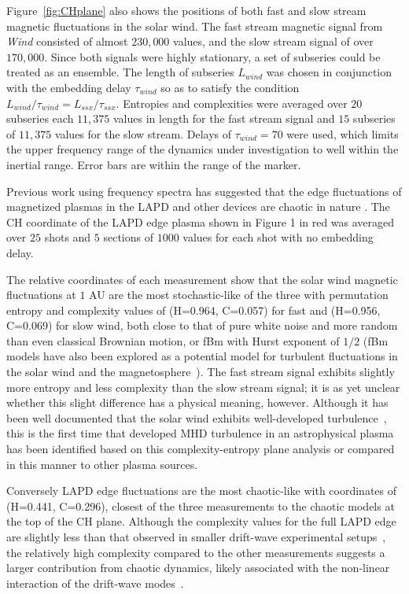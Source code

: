 \documentclass[aps,prx,twocolumn,secnumarabic,nobalancelastpage,amsmath,amssymb,
nofootinbib]{revtex4-1}
\begin{document}
Figure~\ref{fig:CHplane} also shows the positions of both fast and slow stream magnetic fluctuations in the solar wind.  The fast stream magnetic signal from \textit{Wind} consisted of almost $230,000$ values, and the slow stream signal of over $170,000$. Since both signals were highly stationary, a set of subseries could be treated as an ensemble. The length of subseries $L_{wind}$ was chosen in conjunction with the embedding delay $\tau_{wind}$ so as to satisfy the condition $L_{wind}/\tau_{wind} = L_{ssx}/\tau_{ssx}$. Entropies and complexities were averaged over $20$ subseries each $11,375$ values in length for the fast stream signal and $15$ subseries of $11,375$ values for the slow stream. Delays of $\tau_{wind} = 70$ were used, which limits the  upper frequency range of the dynamics under investigation to well within the inertial range. Error bars are within the range of the marker.

Previous work using frequency spectra has suggested that the edge fluctuations of magnetized plasmas in the LAPD and other devices are chaotic in nature \cite{maggs2012}. The CH coordinate of the LAPD edge plasma shown in Figure 1 in red was averaged over $25$ shots and $5$ sections of $1000$ values for each shot with no embedding delay. 

The relative coordinates of each measurement show that the solar wind magnetic fluctuations at $1$ AU are the most stochastic-like of the three with permutation entropy and complexity values of (H=0.964, C=0.057) for fast and (H=0.956, C=0.069) for slow wind, both close to that of pure white noise and more random than even classical Brownian motion, or fBm with Hurst exponent of $1/2$ (fBm models have also been explored as a potential model for turbulent fluctuations in the solar wind and the magnetosphere~\cite{watkins2005}). The fast stream signal exhibits slightly more entropy and less complexity than the slow stream signal; it is as yet unclear whether this slight difference has a physical meaning, however. Although it has been well documented that the solar wind exhibits well-developed turbulence~\cite{bruno2013}, this is the first time that developed MHD turbulence in an astrophysical plasma has been identified based on this complexity-entropy plane analysis or compared in this manner to other plasma sources.

Conversely LAPD edge fluctuations are the most chaotic-like with coordinates of (H=0.441, C=0.296), closest of the three measurements to the chaotic models at the top of the CH plane. Although the complexity values for the full LAPD edge are slightly less than that observed in smaller drift-wave experimental setups~\cite{maggs2013}, the relatively high complexity compared to the other measurements suggests a larger contribution from chaotic dynamics, likely associated with the non-linear interaction of the drift-wave modes~\cite{maggs2012}. 
\end{document}
